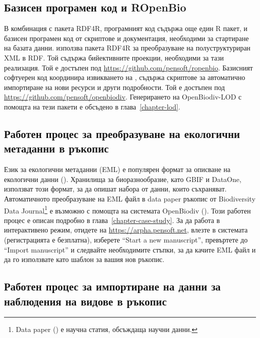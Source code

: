 \subsection{Базисен програмен код и ROpenBio}

В комбинация с пакета RDF4R, програмният код съдържа още един R пакет,  и базисен програмен код от скриптове и документация, необходими за стартиране на базата данни.  използва пакета RDF4R за преобразуване на полуструктуриран XML в RDF. Той съдържа бийективните проекции, необходими за тази реализация. Той е достъпен под \url{https://github.com/pensoft/ropenbio}. Базисният софтуерен код координира извикването на , съдържа скриптове за автоматично импортиране на нови ресурси и други подробности. Той е достъпен под \url{https://github.com/pensoft/openbiodiv}. Генерирането на OpenBiodiv-LOD с помощта на тези пакети е обсъдено в глава~\ref{chapter-lod}.

\subsection{Работен процес за преобразуване на екологични метаданни в ръкопис}

Език за екологични метаданни (EML) е популярен формат за описване на екологични данни (\cite{michener_nongeospatial_1997}). Хранилища за биоразнообразие, като GBIF и DataOne, използват този формат, за да опишат набора от данни, които съхраняват. Автоматичното преобразуване на EML файл в data paper ръкопис от Biodiversity Data Journal\footnote {Data paper (\cite{chavan_data_2011}) е научна статия, обсъждаща научни данни.} е възможно с помощта на системата OpenBiodiv (\cite{senderov_online_2016}). Този работен процес е описан подробно в глава~\ref{chapter-case-study}. За да работа в интерактивено режим, отидете на \url{https://arpha.pensoft.net}, влезте в системата (регистрацията е безплатна), изберете ``Start a new manuscript'', превъртете до ``Import manuscript'' и следвайте необходимите стъпки, за да качите EML файл и да го използвате като шаблон за вашия нов ръкопис.

\subsection{Работен процес за импортиране на данни за наблюдения на видове в ръкопис}

